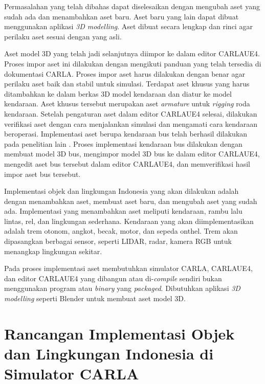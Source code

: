 Permasalahan yang telah dibahas dapat diselesaikan dengan mengubah aset yang
sudah ada dan menambahkan aset baru. Aset baru yang lain dapat dibuat
menggunakan aplikasi \textit{3D modelling}. Aset dibuat secara lengkap dan rinci
agar perilaku aset sesuai dengan yang asli.


Aset model 3D yang telah jadi selanjutnya diimpor ke dalam editor CARLAUE4.
Proses impor aset ini dilakukan dengan mengikuti panduan yang telah tersedia di
dokumentasi CARLA. Proses impor aset harus dilakukan dengan benar agar perilaku
aset baik dan stabil untuk simulasi. Terdapat aset khusus yang harus ditambahkan
ke dalam berkas 3D model kendaraan dan diatur ke model kendaraan. Aset khusus
tersebut merupakan aset \textit{armature} untuk \textit{rigging} roda kendaraan.
Setelah pengaturan aset dalam editor CARLAUE4 selesai, dilakukan verifikasi aset
dengan cara menjalankan simulasi dan mengamati cara kendaraan beroperasi.
Implementasi aset berupa kendaraan bus telah berhasil dilakukan pada penelitian
lain \parencite{related-work-xiang}. Proses implementasi kendaraan bus dilakukan
dengan membuat model 3D bus, mengimpor model 3D bus ke dalam editor CARLAUE4,
mengedit aset bus tersebut dalam editor CARLAUE4, dan memverifikasi hasil impor
aset bus tersebut.

Implementasi objek dan lingkungan Indonesia yang akan dilakukan adalah dengan
menambahkan aset, membuat aset baru, dan mengubah aset yang sudah ada.
Implementasi yang menambahkan aset meliputi kendaraan, rambu lalu lintas, rel,
dan lingkungan sederhana. Kendaraan yang akan diimplementasikan adalah trem
otonom, angkot, becak, motor, dan sepeda onthel. Trem akan dipasangkan
berbagai sensor, seperti LIDAR, radar, kamera RGB untuk menangkap lingkungan
sekitar.


Pada proses implementasi aset membutuhkan simulator CARLA, CARLAUE4, dan editor
CARLAUE4 yang dibangun atau di-\textit{compile} sendiri bukan menggunakan
program atau \textit{binary} yang \textit{packaged}. Dibutuhkan aplikasi
\textit{3D modelling} seperti Blender untuk membuat aset model 3D.

\section{Rancangan Implementasi Objek dan Lingkungan Indonesia di Simulator CARLA}

